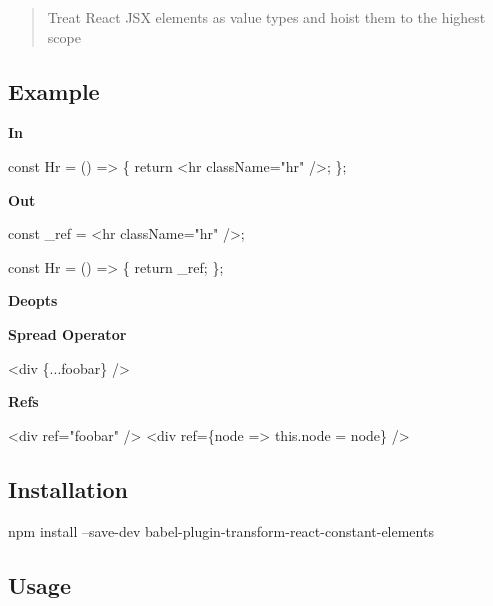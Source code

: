 \begin{quote}
Treat React J\+SX elements as value types and hoist them to the highest scope \end{quote}


\subsection*{Example}

{\bfseries In}


\begin{DoxyCode}
const Hr = () => \{
  return <hr className="hr" />;
\};
\end{DoxyCode}


{\bfseries Out}


\begin{DoxyCode}
const \_ref = <hr className="hr" />;

const Hr = () => \{
  return \_ref;
\};
\end{DoxyCode}


{\bfseries Deopts}


\begin{DoxyItemize}
\item {\bfseries Spread Operator}
\end{DoxyItemize}


\begin{DoxyCode}
<div \{...foobar\} />
\end{DoxyCode}



\begin{DoxyItemize}
\item {\bfseries Refs}
\end{DoxyItemize}


\begin{DoxyCode}
<div ref="foobar" />
<div ref=\{node => this.node = node\} />
\end{DoxyCode}


\subsection*{Installation}


\begin{DoxyCode}
npm install --save-dev babel-plugin-transform-react-constant-elements
\end{DoxyCode}


\subsection*{Usage}

